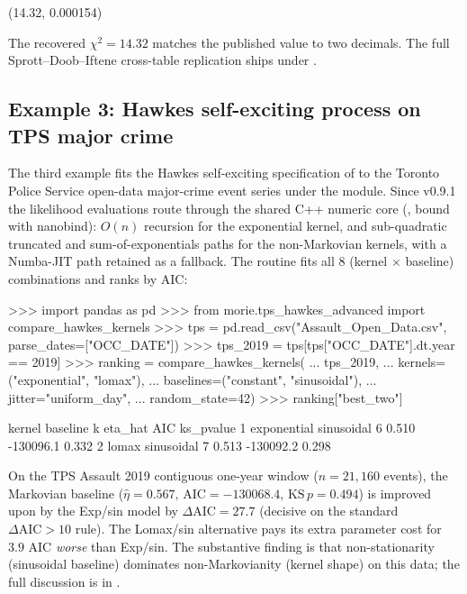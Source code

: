 \documentclass[article,shortnames,nojss]{jss}
\begin{document}
\begin{Code}
(14.32, 0.000154)
\end{Code}

The recovered $\chi^{2} = 14.32$ matches the published value to
two decimals.  The full Sprott--Doob--Iftene cross-table replication
ships under .

\subsection{Example 3: Hawkes self-exciting process on TPS major crime}

The third example fits the Hawkes self-exciting specification of
\citet{Ruhela2026Hawkes} to the Toronto Police Service open-data
major-crime event series under the 
module. Since v0.9.1 the likelihood evaluations route through the
shared C++ numeric core (, bound with nanobind):
$O(n)$ recursion for the exponential kernel, and sub-quadratic
truncated and sum-of-exponentials paths for the non-Markovian
kernels, with a Numba-JIT path retained as a fallback. The
 routine fits all 8 (kernel $\times$
baseline) combinations and ranks by AIC:

\begin{Code}
>>> import pandas as pd
>>> from morie.tps_hawkes_advanced import compare_hawkes_kernels
>>> tps = pd.read_csv("Assault_Open_Data.csv", parse_dates=["OCC_DATE"])
>>> tps_2019 = tps[tps["OCC_DATE"].dt.year == 2019]
>>> ranking = compare_hawkes_kernels(
...     tps_2019,
...     kernels=("exponential", "lomax"),
...     baselines=("constant", "sinusoidal"),
...     jitter="uniform_day",
...     random_state=42)
>>> ranking["best_two"]
\end{Code}

\begin{Code}
       kernel    baseline  k    eta_hat       AIC   ks_pvalue
1 exponential  sinusoidal  6      0.510  -130096.1      0.332
2       lomax  sinusoidal  7      0.513  -130092.2      0.298
\end{Code}

On the TPS Assault 2019 contiguous one-year window ($n=21{,}160$
events), the Markovian baseline ($\hat\eta=0.567,\,\mathrm{AIC}=-130068.4,\,\mathrm{KS}\,p=0.494$)
is improved upon by the Exp/sin model by $\Delta\mathrm{AIC} = 27.7$
(decisive on the standard $\Delta\mathrm{AIC} > 10$ rule).  The
Lomax/sin alternative pays its extra parameter cost for $3.9$
AIC \emph{worse} than Exp/sin.  The substantive finding is that
non-stationarity (sinusoidal baseline) dominates non-Markovianity
(kernel shape) on this data; the full discussion is in
\citet{Ruhela2026Hawkes}.
\end{document}
